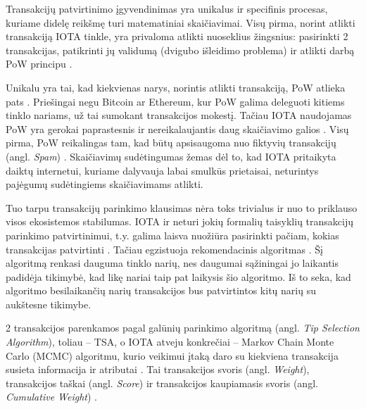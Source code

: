 Transakcijų patvirtinimo įgyvendinimas yra unikalus ir specifinis procesas, kuriame didelę reikšmę turi matematiniai skaičiavimai. Visų pirma, norint atlikti transakciją IOTA tinkle, yra privaloma atlikti nuoseklius žingsnius: pasirinkti 2 transakcijas, patikrinti jų validumą (dvigubo išleidimo problema) ir atlikti darbą PoW principu \cite{popov2016tangle}. 

Unikalu yra tai, kad kiekvienas narys, norintis atlikti transakciją, PoW atlieka pats \cite{bramas2018stability}. Priešingai negu Bitcoin ar Ethereum, kur PoW galima deleguoti kitiems tinklo nariams, už tai sumokant transakcijos mokestį. Tačiau IOTA naudojamas PoW yra gerokai paprastesnis ir nereikalaujantis daug skaičiavimo galios \cite{popov2016tangle}. Visų pirma, PoW reikalingas tam, kad būtų apsisaugoma nuo fiktyvių transakcijų (angl. \textit{Spam}) \cite{popov2016tangle}. Skaičiavimų sudėtingumas žemas dėl to, kad IOTA pritaikyta daiktų internetui, kuriame dalyvauja labai smulkūs prietaisai, neturintys pajėgumų sudėtingiems skaičiavimams atlikti.

Tuo tarpu transakcijų parinkimo klausimas nėra toks trivialus ir nuo to priklauso visos ekosistemos stabilumas. IOTA ir neturi jokių formalių taisyklių transakcijų parinkimo patvirtinimui, t.y. galima laisva nuožiūra pasirinkti pačiam, kokias transakcijas patvirtinti \cite{popov2016tangle}. Tačiau egzistuoja rekomendacinis algoritmas \cite{popov2016tangle}. Šį algoritmą renkasi dauguma tinklo narių, nes daugumai sąžiningai jo laikantis padidėja tikimybė, kad likę nariai taip pat laikysis šio algoritmo. Iš to seka, kad algoritmo besilaikančių narių transakcijos bus patvirtintos kitų narių su aukštesne tikimybe.

2 transakcijos parenkamos pagal galūnių parinkimo algoritmą (angl. \textit{Tip Selection Algorithm}), toliau – TSA, o IOTA atveju konkrečiai – Markov Chain Monte Carlo (MCMC) algoritmu, kurio veikimui įtaką daro su kiekviena transakcija susieta informacija ir atributai \cite{bramas2018stability}. Tai transakcijos svoris (angl. \textit{Weight}), transakcijos taškai (angl. \textit{Score}) ir transakcijos kaupiamasis svoris (angl. \textit{Cumulative Weight}) \cite{popov2016tangle}. 





